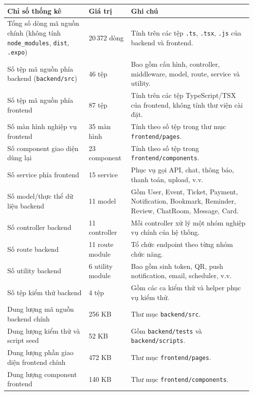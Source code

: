 \documentclass[../DoAn.tex]{subfiles}
\begin{document}
\begin{table}[H]
\centering
\small
\renewcommand{\arraystretch}{1.2}
\begin{tabular}{|p{6.0cm}|p{3.2cm}|p{5.3cm}|}
\hline
\textbf{Chỉ số thống kê} & \textbf{Giá trị} & \textbf{Ghi chú} \\ \hline
Tổng số dòng mã nguồn chính (không tính \texttt{node\_modules}, \texttt{dist}, \texttt{.expo}) & 20\,372 dòng & Tính trên các tệp \texttt{.ts}, \texttt{.tsx}, \texttt{.js} của backend và frontend. \\ \hline
Số tệp mã nguồn phía backend (\texttt{backend/src}) & 46 tệp & Bao gồm cấu hình, controller, middleware, model, route, service và utility. \\ \hline
Số tệp mã nguồn phía frontend & 87 tệp & Tính trên các tệp TypeScript/TSX của frontend, không tính thư viện cài đặt. \\ \hline
Số màn hình nghiệp vụ frontend & 35 màn hình & Tính theo số tệp trong thư mục \texttt{frontend/pages}. \\ \hline
Số component giao diện dùng lại & 23 component & Tính theo số tệp trong \texttt{frontend/components}. \\ \hline
Số service phía frontend & 15 service & Phục vụ gọi API, chat, thông báo, thanh toán, upload, v.v. \\ \hline
Số model/thực thể dữ liệu backend & 11 model & Gồm User, Event, Ticket, Payment, Notification, Bookmark, Reminder, Review, ChatRoom, Message, Card. \\ \hline
Số controller backend & 11 controller & Mỗi controller xử lý một nhóm nghiệp vụ chính của hệ thống. \\ \hline
Số route backend & 11 route module & Tổ chức endpoint theo từng nhóm chức năng. \\ \hline
Số utility backend & 6 utility module & Bao gồm sinh token, QR, push notification, email, scheduler, v.v. \\ \hline
Số tệp kiểm thử backend & 4 tệp & Gồm các ca kiểm thử và helper phục vụ kiểm thử. \\ \hline
Dung lượng mã nguồn backend chính & 256 KB & Thư mục \texttt{backend/src}. \\ \hline
Dung lượng kiểm thử và script seed & 52 KB & Gồm \texttt{backend/tests} và \texttt{backend/scripts}. \\ \hline
Dung lượng phần giao diện frontend chính & 472 KB & Thư mục \texttt{frontend/pages}. \\ \hline
Dung lượng component frontend & 140 KB & Thư mục \texttt{frontend/components}. \\ \hline

\end{tabular}
\end{table}
\end{document}
